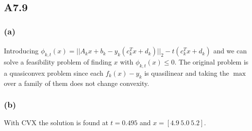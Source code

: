 \subsection*{A7.9}
\subsubsection*{(a)}
\paragraph{}
Introducing $\phi_{k,t}(x) = ||A_kx+b_k- y_k(c^T_kx + d_k)||_2 - t(c^T_kx + d_k)$ and we can solve a feasibility problem of finding $x$ with $\phi_{k,t}(x) \leq 0$. The original problem is a quasiconvex problem since each $f_k(x) - y_k$ is quasilinear and taking the $\max$ over a family of them does not change convexity.
\subsubsection*{(b)}
With CVX the solution is found at $t = 0.495$ and $x =[4.9\ 5.0\ 5.2]$.

